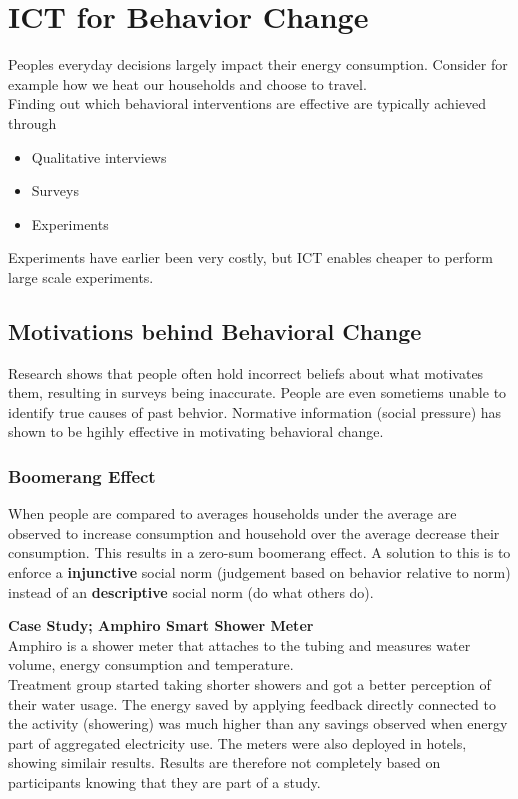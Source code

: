 \section{ICT for Behavior Change}
Peoples everyday decisions largely impact their energy consumption.
Consider for example how we heat our households and choose to travel.\\

Finding out which behavioral interventions are effective are typically achieved through
\begin{itemize}
    \item Qualitative interviews
    \item Surveys
    \item Experiments
\end{itemize}
Experiments have earlier been very costly, but ICT enables cheaper to perform large scale experiments.

\subsection{Motivations behind Behavioral Change}
Research shows that people often hold incorrect beliefs about what motivates them, resulting in surveys being inaccurate.
People are even sometiems unable to identify true causes of past behvior.
Normative information (social pressure) has shown to be hgihly effective in motivating behavioral change.

\subsubsection{Boomerang Effect}
When people are compared to averages households under the average are observed to increase consumption and household over the average decrease their consumption.
This results in a zero-sum boomerang effect.
A solution to this is to enforce a \textbf{injunctive} social norm (judgement based on behavior relative to norm) instead of an \textbf{descriptive} social norm (do what others do).

\begin{tcolorbox}
\textbf{Case Study; Amphiro Smart Shower Meter}\\
Amphiro is a shower meter that attaches to the tubing and measures water volume, energy consumption and temperature.\\

Treatment group started taking shorter showers and got a better perception of their water usage.
The energy saved by applying feedback directly connected to the activity (showering) was much higher than any savings observed when energy part of aggregated electricity use.
The meters were also deployed in hotels, showing similair results.
Results are therefore not completely based on participants knowing that they are part of a study.

\end{tcolorbox}

